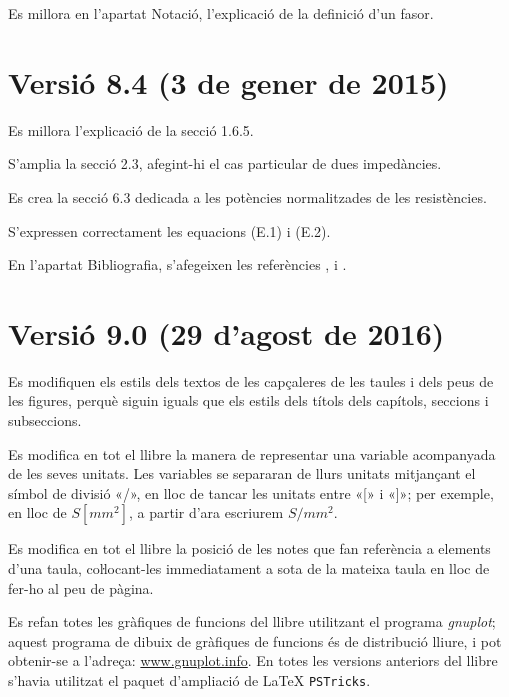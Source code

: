 Es millora en l'apartat Notació, l'explicació de la definició d'un fasor.


\section*{Versió 8.4 (3 de gener de 2015)}

Es millora l'explicació de la secció 1.6.5.

S'amplia la secció 2.3, afegint-hi el cas particular de dues impedàncies.

Es crea la secció 6.3 dedicada a les potències normalitzades de les resistències.

S'expressen correctament les equacions (E.1) i (E.2).

En l'apartat Bibliografia, s'afegeixen les referències \cite{AGVS}, \cite{JSch} i \cite{RRop}.


\section*{Versió 9.0 (29 d’agost de 2016)}

Es modifiquen els estils dels textos de les capçaleres de les taules i dels peus de les figures, perquè siguin iguals que els estils dels títols dels capítols, seccions i subseccions.

Es modifica en tot el llibre la manera de representar una variable acompanyada de les seves unitats. Les variables se separaran de llurs unitats mitjançant el símbol de divisió «/», en lloc de tancar les unitats entre «[» i  «]»; per exemple, en lloc de $S\unit{[mm^2]}$, a partir d'ara escriurem $S/\unit{mm^2}$.

Es modifica en tot el llibre la posició de les notes que fan referència a elements d'una taula, coŀlocant-les immediatament a sota de la mateixa taula en lloc de fer-ho al peu de pàgina.

Es refan totes les gràfiques de funcions del llibre utilitzant el programa \emph{gnuplot}; aquest programa de dibuix de gràfiques de funcions és de distribució lliure, i pot obtenir-se a l'adreça: \href{http://www.gnuplot.info/}{www.gnuplot.info}. En totes les versions anteriors del llibre s'havia utilitzat el paquet d'ampliació de \LaTeX{} \texttt{PSTricks}.

